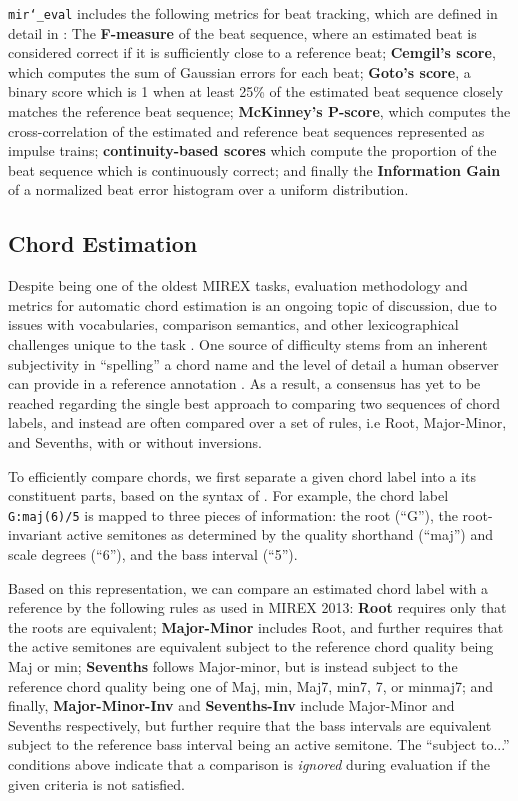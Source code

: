 \documentclass{article}
\def\mireval{\texttt{mir\char`_eval}}
\begin{document}
\mireval{} includes the following metrics for beat tracking, which are defined in detail in \cite{davies2009evaluation}:
The \textbf{F-measure} of the beat sequence, where an estimated beat is considered correct if it is sufficiently close to a reference beat;
\textbf{Cemgil's score}, which computes the sum of Gaussian errors for each beat;
\textbf{Goto's score}, a binary score which is 1 when at least 25\% of the estimated beat sequence closely matches the reference beat sequence;
\textbf{McKinney's P-score}, which computes the cross-correlation of the estimated and reference beat sequences represented as impulse trains;
\textbf{continuity-based scores} which compute the proportion of the beat sequence which is continuously correct;
and finally the \textbf{Information Gain} of a normalized beat error histogram over a uniform distribution.

\subsection{Chord Estimation}

Despite being one of the oldest MIREX tasks, evaluation methodology and metrics for automatic chord estimation is an ongoing topic of discussion, due to issues with vocabularies, comparison semantics, and other lexicographical challenges unique to the task \cite{pauwels2013evaluating}.
One source of difficulty stems from an inherent subjectivity in ``spelling'' a chord name and the level of detail a human observer can provide in a reference annotation \cite{ni2013understanding}.
As a result, a consensus has yet to be reached regarding the single best approach to comparing two sequences of chord labels, and instead are often compared over a set of rules, i.e Root, Major-Minor, and Sevenths, with or without inversions.

To efficiently compare chords, we first separate a given chord label into a its constituent parts, based on the syntax of \cite{harte2010towards}.
For example, the chord label \texttt{G:maj(6)/5} is mapped to three pieces of information: the root (``G''), the root-invariant active semitones as determined by the quality shorthand (``maj'') and scale degrees (``6''), and the bass interval (``5'').

Based on this representation, we can compare an estimated chord label with a reference by the following rules as used in MIREX 2013\cite{choi2013mirex}:
\textbf{Root} requires only that the roots are equivalent;
\textbf{Major-Minor} includes Root, and further requires that the active semitones are equivalent subject to the reference chord quality being Maj or min;
\textbf{Sevenths} follows Major-minor, but is instead subject to the reference chord quality being one of Maj, min, Maj7, min7, 7, or minmaj7;
and finally, \textbf{Major-Minor-Inv} and \textbf{Sevenths-Inv} include Major-Minor and Sevenths respectively, but further require that the bass intervals are equivalent subject to the reference bass interval being an active semitone.
The ``subject to...'' conditions above indicate that a comparison is \emph{ignored} during evaluation if the given criteria is not satisfied.
\end{document}
